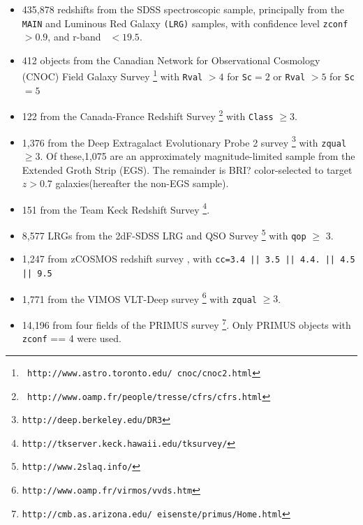 \documentclass{emulateapj}
\begin{document}
\begin{itemize} 

    \item 435,878 redshifts from the SDSS spectroscopic sample,
principally from the \texttt{MAIN} and Luminous Red Galaxy \texttt{(LRG)}
samples, with confidence level \texttt{zconf}$ > 0.9$, and r-band
\cmodelmag\ $ <19.5$.


    \item 412 objects from the Canadian Network for Observational
Cosmology (CNOC) Field Galaxy Survey \cite[CNOC2;][]{yee00}\footnote{\tt
http://www.astro.toronto.edu/~cnoc/cnoc2.html} with \texttt{Rval} $>4$
for \texttt{Sc}$=2$ or \texttt{Rval} $> 5$ for \texttt{Sc}$=5$

    \item 122 from the Canada-France Redshift
Survey \cite[CFRS;][]{lilly95}\footnote{\tt
http://www.oamp.fr/people/tresse/cfrs/cfrs.html} with \texttt{Class} $\geq 3$.

    \item 1,376 from the Deep Extragalact Evolutionary Probe 2 survey
\citep[DEEP2;][]{weiner05}\footnote{\tt http://deep.berkeley.edu/DR3}
with \texttt{zqual} $\geq 3$. 
Of these,1,075 are an approximately magnitude-limited sample from the Extended Groth Strip (EGS).
The remainder is BRI? color-selected to target $z>0.7$ galaxies(hereafter the non-EGS sample). 

    \item 151 from the Team Keck Redshift Survey \cite[TKRS;][]{wirth04}\footnote{\tt http://tkserver.keck.hawaii.edu/tksurvey/}.

    \item 8,577 LRGs from the 2dF-SDSS LRG and QSO Survey \cite[2SLAQ;][]{cannon06}\footnote{\tt http://www.2slaq.info/} with \texttt{qop} $\geq$ 3.

    \item  1,247 from zCOSMOS redshift survey \cite{lilly07}, with  \texttt{cc=3.4 || 3.5 || 4.4.  || 4.5 || 9.5}
    
    \item 1,771 from the VIMOS VLT-Deep survey \cite[VVDS;][]{garilli08}\footnote{\tt http://www.oamp.fr/virmos/vvds.htm} with \texttt{zqual} $\geq 3$.

    \item 14,196 from four fields of the PRIMUS survey \cite[PRIMUS;][]{coil10}\footnote{\tt http://cmb.as.arizona.edu/~eisenste/primus/Home.html}.  Only PRIMUS objects with \texttt{zconf} == 4 were used.      
\end{itemize}
\end{document}
